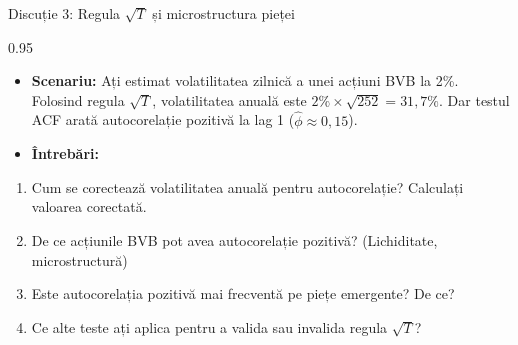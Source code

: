\documentclass[9pt, aspectratio=169, t]{beamer}
\begin{document}
\begin{frame}[shrink=10]{Discuție 3: Regula $\sqrt{T}$ și microstructura pieței}
\begin{cminipage}{0.95\textwidth}
    \begin{itemize}\setlength{\itemsep}{0pt}
        \item \textbf{Scenariu:} Ați estimat volatilitatea zilnică a unei acțiuni BVB la 2\%. Folosind regula $\sqrt{T}$, volatilitatea anuală este $2\% \times \sqrt{252} = 31{,}7\%$. Dar testul ACF arată autocorelație pozitivă la lag 1 ($\hat{\phi} \approx 0{,}15$).
        \item \textbf{Întrebări:}
    \end{itemize}
    \begin{enumerate}\setlength{\itemsep}{0pt}
        \item Cum se corectează volatilitatea anuală pentru autocorelație? Calculați valoarea corectată.
        \item De ce acțiunile BVB pot avea autocorelație pozitivă? (Lichiditate, microstructură)
        \item Este autocorelația pozitivă mai frecventă pe piețe emergente? De ce?
        \item Ce alte teste ați aplica pentru a valida sau invalida regula $\sqrt{T}$?
    \end{enumerate}
\end{cminipage}
\end{frame}
\end{document}
